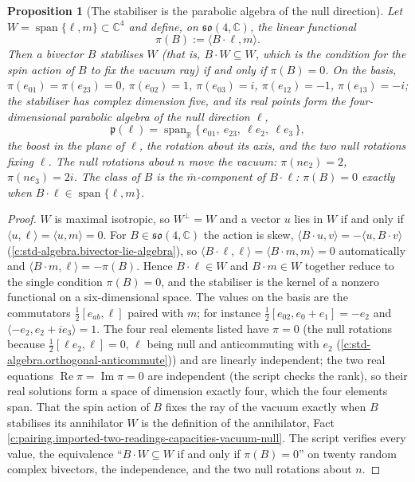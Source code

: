 \documentclass[11pt]{article}
\newtheorem{proposition}[theorem]{Proposition}
\theoremstyle{definition}
\theoremstyle{plain}
\providecommand{\C}{}\renewcommand{\C}{\mathbb{C}}
\providecommand{\R}{}\renewcommand{\R}{\mathbb{R}}
\providecommand{\mb}{}\renewcommand{\mb}{\bar m}
\providecommand{\pv}{}\renewcommand{\pv}{\pi}
\providecommand{\so}{}\renewcommand{\so}{\mathfrak{so}}
\providecommand{\ip}{}\renewcommand{\ip}[2]{\langle #1, #2\rangle}
\begin{document}
\begin{proposition}[The stabiliser is the parabolic algebra of the null direction]\label{c:pairing.stabiliser-parabolic-algebra-null-direction}
Let $W = \operatorname{span}\{\ell, m\} \subset \C^{4}$ and define, on $\so(4,\C)$, the linear functional
\[
\pv(B) := \ip{B\cdot\ell}{m} .
\]
Then a bivector $B$ stabilises $W$ (that is, $B\cdot W \subseteq W$, which is the condition for the spin action of $B$ to fix the vacuum ray) if and only if $\pv(B) = 0$. On the basis, $\pv(e_{01}) = \pv(e_{23}) = 0$, $\pv(e_{02}) = 1$, $\pv(e_{03}) = i$, $\pv(e_{12}) = -1$, $\pv(e_{13}) = -i$; the stabiliser has complex dimension five, and its real points form the four-dimensional parabolic algebra of the null direction $\ell$,
\[
\mathfrak{p}(\ell) = \operatorname{span}_{\R}\{\,e_{01},\ e_{23},\ \ell e_{2},\ \ell e_{3}\,\},
\]
the boost in the plane of $\ell$, the rotation about its axis, and the two null rotations fixing $\ell$. The null rotations about $n$ move the vacuum: $\pv(n e_{2}) = 2$, $\pv(n e_{3}) = 2i$. The class of $B$ is the $\mb$-component of $B\cdot\ell$: $\pv(B) = 0$ exactly when $B\cdot\ell \in \operatorname{span}\{\ell, m\}$.
\end{proposition}
\begin{proof}
$W$ is maximal isotropic, so $W^{\perp} = W$ and a vector $u$ lies in $W$ if and only if $\ip{u}{\ell} = \ip{u}{m} = 0$. For $B \in \so(4,\C)$ the action is skew, $\ip{B\cdot u}{v} = -\ip{u}{B\cdot v}$ (\ref{c:std-algebra.bivector-lie-algebra}), so $\ip{B\cdot\ell}{\ell} = \ip{B\cdot m}{m} = 0$ automatically and $\ip{B\cdot m}{\ell} = -\pv(B)$. Hence $B\cdot\ell \in W$ and $B\cdot m \in W$ together reduce to the single condition $\pv(B) = 0$, and the stabiliser is the kernel of a nonzero functional on a six-dimensional space. The values on the basis are the commutators $\tfrac12[e_{ab}, \ell]$ paired with $m$; for instance $\tfrac12[e_{02}, e_{0} + e_{1}] = -e_{2}$ and $\ip{-e_{2}}{e_{2} + ie_{3}} = 1$. The four real elements listed have $\pv = 0$ (the null rotations because $\tfrac12[\ell e_{2}, \ell] = 0$, $\ell$ being null and anticommuting with $e_{2}$ (\ref{c:std-algebra.orthogonal-anticommute})) and are linearly independent; the two real equations $\operatorname{Re}\pv = \operatorname{Im}\pv = 0$ are independent (the script checks the rank), so their real solutions form a space of dimension exactly four, which the four elements span. That the spin action of $B$ fixes the ray of the vacuum exactly when $B$ stabilises its annihilator $W$ is the definition of the annihilator, Fact \ref{c:pairing.imported-two-readings-capacities-vacuum-null}. The script verifies every value, the equivalence ``$B\cdot W \subseteq W$ if and only if $\pv(B) = 0$'' on twenty random complex bivectors, the independence, and the two null rotations about $n$.

\end{proof}
\end{document}

